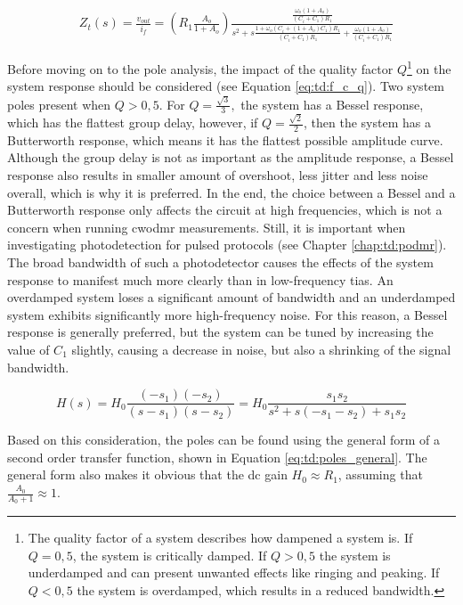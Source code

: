 \begin{equation}\label{eq:td:zt}
	\begin{aligned}
		&Z_t(s) = \frac{v_{out}}{i_f} = (R_1\frac{A_o}{1 + A_o})\frac{\frac{\omega_o(1 + A_o)}{(C_i + C_1)R_1}}{s^2 + s\frac{1 + \omega_o(C_i + (1 + A_o)C_1)R_1}{(C_i + C_1)R_1} + \frac{\omega_o(1 + A_o)}{(C_i + C_1)R_1}}
	\end{aligned}
\end{equation}

Before moving on to the pole analysis, the impact of the quality factor $Q$\footnote{The quality factor of a system describes how dampened a system is. If $Q = 0,5$, the system is critically damped. If $Q > 0,5$ the system is underdamped and can present unwanted effects like ringing and peaking. If $Q < 0,5$ the system is overdamped, which results in a reduced bandwidth.} on the system response should be considered (see Equation \eqref{eq:td:f_c_q}). Two system poles present when $Q > 0,5$. For $Q = \frac{\sqrt{3}}{3},$ the system has a Bessel response, which has the flattest group delay, however, if $Q = \frac{\sqrt{2}}{2}$, then the system has a Butterworth response, which means it has the flattest possible amplitude curve. Although the group delay is not as important as the amplitude response, a Bessel response also results in smaller amount of overshoot, less jitter and less noise overall, which is why it is preferred. In the end, the choice between a Bessel and a Butterworth response only affects the circuit at high frequencies, which is not a concern when running \gls{cwodmr} measurements. Still, it is important when investigating photodetection for pulsed protocols (see Chapter \ref{chap:td:podmr}). The broad bandwidth of such a photodetector causes the effects of the system response to manifest much more clearly than in low-frequency \glspl{tia}. An overdamped system loses a significant amount of bandwidth and an underdamped system exhibits significantly more high-frequency noise. For this reason, a Bessel response is generally preferred, but the system can be tuned by increasing the value of $C_1$ slightly, causing a decrease in noise, but also a shrinking of the signal bandwidth.

\begin{equation}\label{eq:td:poles_general}
	H(s) = H_0\frac{(-s_1)(-s_2)}{(s - s_1)(s - s_2)} = H_0\frac{s_1s_2}{s^2 + s(-s_1 - s_2) + s_1s_2}
\end{equation}

Based on this consideration, the poles can be found using the general form of a second order transfer function, shown in Equation \eqref{eq:td:poles_general}. The general form also makes it obvious that the \gls{dc} gain $H_0 \approx R_1$, assuming that $\frac{A_0}{A_0 + 1} \approx 1$.


